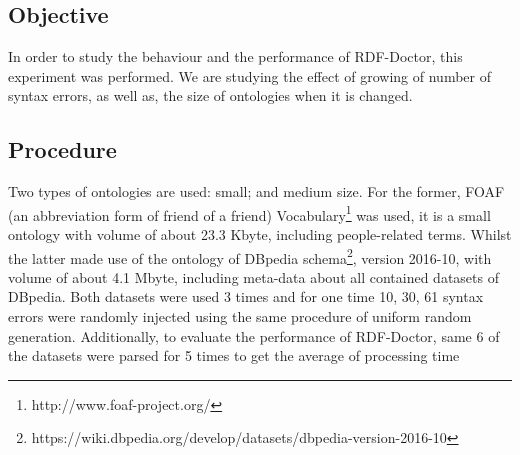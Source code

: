 \subsection{Objective}

In order to study the behaviour and the performance of RDF-Doctor, this experiment was performed. We are studying the effect of growing of number of syntax errors, as well as, the size of ontologies when it is changed. 


\subsection{Procedure}
Two types of ontologies are used: small; and medium size. For the former, FOAF  (an abbreviation form of friend of a friend) Vocabulary\footnote{http://www.foaf-project.org/} was used, it is a small ontology with volume of about 23.3 Kbyte, including people-related terms. Whilst the latter made use of the ontology  of DBpedia schema\footnote{https://wiki.dbpedia.org/develop/datasets/dbpedia-version-2016-10}, version 2016-10, with volume of about 4.1 Mbyte, including meta-data about all contained datasets of DBpedia. Both datasets were used 3 times and for one time 10, 30, 61 syntax errors were randomly  injected using the same procedure of uniform random generation. Additionally, to evaluate the performance of RDF-Doctor, same 6 of the datasets were parsed for 5 times to get the average of processing time  

 
